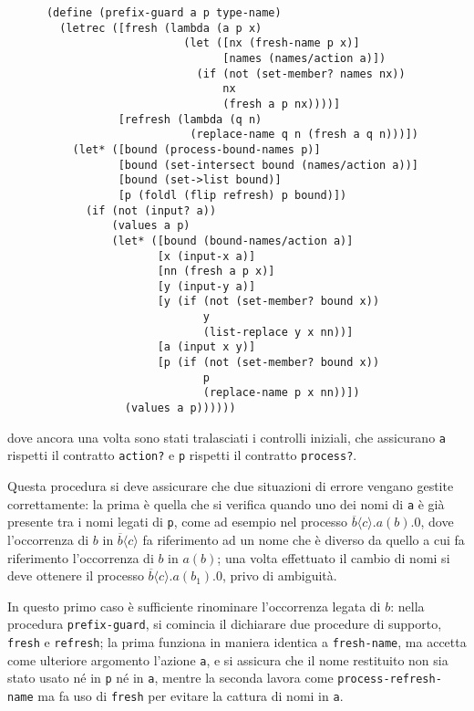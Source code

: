 \begin{lstlisting}
      (define (prefix-guard a p type-name)
        (letrec ([fresh (lambda (a p x)
                           (let ([nx (fresh-name p x)]
                                 [names (names/action a)])
                             (if (not (set-member? names nx))
                                 nx
                                 (fresh a p nx))))]
                 [refresh (lambda (q n)
                            (replace-name q n (fresh a q n)))])
          (let* ([bound (process-bound-names p)]
                 [bound (set-intersect bound (names/action a))]
                 [bound (set->list bound)]
                 [p (foldl (flip refresh) p bound)])
            (if (not (input? a))
                (values a p)
                (let* ([bound (bound-names/action a)]
                       [x (input-x a)]
                       [nn (fresh a p x)]
                       [y (input-y a)]
                       [y (if (not (set-member? bound x))
                              y
                              (list-replace y x nn))]
                       [a (input x y)]
                       [p (if (not (set-member? bound x))
                              p
                              (replace-name p x nn))])
                  (values a p))))))
\end{lstlisting}

dove ancora una volta sono stati tralasciati i controlli iniziali, che
assicurano \lstinline{a} rispetti il contratto \lstinline{action?} e
\lstinline{p} rispetti il contratto \lstinline{process?}.

Questa procedura si deve assicurare che due situazioni di errore vengano
gestite correttamente: la prima \`e quella che si verifica quando uno dei
nomi di \lstinline{a} \`e gi\`a presente tra i nomi legati di
\lstinline{p}, come ad esempio nel processo
$\overline{b}\langle c\rangle.a(b).0$, dove l'occorrenza di $b$
in $\overline{b}\langle c\rangle$ fa riferimento ad un nome che \`e diverso
da quello a cui fa riferimento l'occorrenza di $b$ in $a(b)$; una volta
effettuato il cambio di nomi si deve ottenere il processo
$\overline{b}\langle c\rangle.a(b_1).0$, privo di ambiguit\`a.

In questo primo caso \`e sufficiente rinominare l'occorrenza legata di $b$:
nella procedura \lstinline{prefix-guard}, si comincia il dichiarare due
procedure di supporto, \lstinline{fresh} e \lstinline{refresh}; la prima
funziona in maniera identica a \lstinline{fresh-name}, ma accetta come
ulteriore argomento l'azione \lstinline{a}, e si assicura che il nome
restituito non sia stato usato n\'e in \lstinline{p} n\'e in \lstinline{a},
mentre la seconda lavora come \lstinline{process-refresh-name} ma fa uso
di \lstinline{fresh} per evitare la cattura di nomi in \lstinline{a}.

